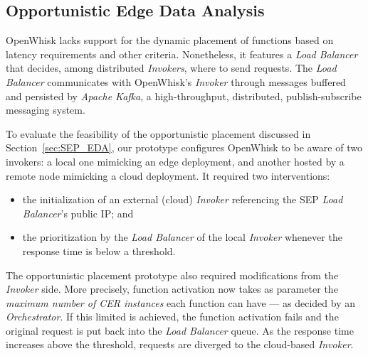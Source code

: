 

\subsection{Opportunistic Edge Data Analysis}

OpenWhisk lacks support for the dynamic placement of functions based on latency requirements and other criteria. Nonetheless, it features a \textit{Load Balancer} that decides, among distributed \textit{Invokers}, where to send requests. 
The \textit{Load Balancer} communicates with OpenWhisk's \textit{Invoker} through messages buffered and persisted by \textit{Apache Kafka}, a high-throughput, distributed, publish-subscribe messaging system.


To evaluate the feasibility of the opportunistic placement discussed in Section~\ref{sec:SEP_EDA}, our prototype configures OpenWhisk to be aware of two invokers: a local one mimicking an edge deployment, and another hosted by a remote node mimicking a cloud deployment. It required two interventions: 

\begin{itemize}
    \item the initialization of an external (cloud) \textit{Invoker} referencing the SEP \textit{Load Balancer}'s public IP; and
    
    \item the prioritization by the \textit{Load Balancer} of the local \textit{Invoker} whenever the response time is below a threshold. %
\end{itemize}

The opportunistic placement prototype also required modifications from the \textit{Invoker} side. More precisely, function activation now takes as parameter the \textit{maximum number of CER instances} each function can have --- as decided by an \textit{Orchestrator}. If this limited is achieved, the function activation fails and the original request is put back into the \textit{Load Balancer} queue. As the response time increases above the threshold, requests are diverged 
to the cloud-based \textit{Invoker}. 

